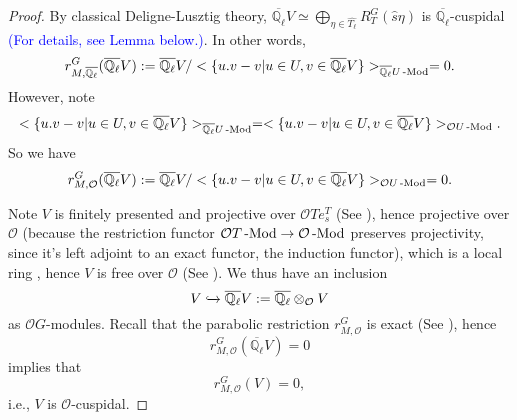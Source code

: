 \begin{proof}
		By classical Deligne-Lusztig theory, $\overline{\mathbb{Q}_{\ell}}V \simeq \bigoplus_{\eta \in \hat{T_{\ell}}}R_T^G(\hat{s}\eta)$ 
		is $\overline{\mathbb{Q}_{\ell}}$-cuspidal \textcolor{blue}{(For details, see Lemma below.)}. 
		In other words, 
		$$r^G_{M, \overline{\mathbb{Q}_{\ell}}}(\overline{\mathbb{Q}_{\ell}}V):=\overline{\mathbb{Q}_{\ell}}V/<\{u.v-v | u \in U, v \in \overline{\mathbb{Q}_{\ell}}V\}>_{\overline{\mathbb{Q}_{\ell}}U\operatorname{-Mod}}=0.$$
		However, note  
		$$<\{u.v-v | u \in U, v \in \overline{\mathbb{Q}_{\ell}}V\}>_{\overline{\mathbb{Q}_{\ell}}U\operatorname{-Mod}}=<\{u.v-v | u \in U, v \in \overline{\mathbb{Q}_{\ell}}V\}>_{\mathcal{O}U\operatorname{-Mod}}.$$
		So we have 
		$$r^G_{M, \mathcal{O}}(\overline{\mathbb{Q}_{\ell}}V):=\overline{\mathbb{Q}_{\ell}}V/<\{u.v-v | u \in U, v \in \overline{\mathbb{Q}_{\ell}}V\}>_{\mathcal{O}U\operatorname{-Mod}}=0.$$
		
		Note $V$ is finitely presented and projective over $\mathcal{O}Te_s^T$ (See \cite[Proof of Theorem 3.3]{broue1990isometries}), hence projective over $\mathcal{O}$ (because the restriction functor $\mathcal{O}T\operatorname{-Mod} \to \mathcal{O}\operatorname{-Mod}$ preserves projectivity, since it's left adjoint to an exact functor, the induction functor), which is a local ring 
		, hence $V$ is free over $\mathcal{O}$ (See \cite[Theorem 24.4.5]{vakil2017rising}). We thus have an inclusion
		$$V \xhookrightarrow[]{} \overline{\mathbb{Q}_{\ell}}V:=\overline{\mathbb{Q}_{\ell}}\otimes_{\mathcal{O}}V %
		$$
		as $\mathcal{O}G$-modules.
		Recall that the parabolic restriction $r^G_{M, \mathcal{O}}$ is exact (See \cite[II.2.1]{vigneras1996representations}), hence 
		$$r^G_{M, \mathcal{O}}(\overline{\mathbb{Q}_{\ell}}V)=0$$
		implies that 
		$$r^G_{M, \mathcal{O}}(V)=0,$$
		i.e., $V$ is $\mathcal{O}$-cuspidal. 
		

\end{proof}
